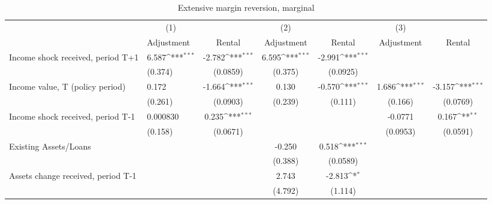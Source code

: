 \begin{table}[htbp]\centering
\def\sym#1{\ifmmode^{#1}\else\(^{#1}\)\fi}
\caption{Extensive margin reversion, marginal}
\begin{tabular}{p{0.8in}l*{5}{c}}
\hline\hline
                    &\multicolumn{1}{c}{(1)}         &                     &\multicolumn{1}{c}{(2)}         &                     &\multicolumn{1}{c}{(3)}         &                     \\
                    &  Adjustment         &      Rental         &  Adjustment         &      Rental         &  Adjustment         &      Rental         \\
\hline
Income shock received, period T+1&       6.587\sym{***}&      -2.782\sym{***}&       6.595\sym{***}&      -2.991\sym{***}&                     &                     \\
                    &     (0.374)         &    (0.0859)         &     (0.375)         &    (0.0925)         &                     &                     \\
Income value, T (policy period)&       0.172         &      -1.664\sym{***}&       0.130         &      -0.570\sym{***}&       1.686\sym{***}&      -3.157\sym{***}\\
                    &     (0.261)         &    (0.0903)         &     (0.239)         &     (0.111)         &     (0.166)         &    (0.0769)         \\
Income shock received, period T-1&    0.000830         &       0.235\sym{***}&                     &                     &     -0.0771         &       0.167\sym{**} \\
                    &     (0.158)         &    (0.0671)         &                     &                     &    (0.0953)         &    (0.0591)         \\
Existing Assets/Loans&                     &                     &      -0.250         &       0.518\sym{***}&                     &                     \\
                    &                     &                     &     (0.388)         &    (0.0589)         &                     &                     \\
Assets change received, period T-1&                     &                     &       2.743         &      -2.813\sym{*}  &                     &                     \\
                    &                     &                     &     (4.792)         &     (1.114)         &                     &                     \\

\end{tabular}
\end{table}
